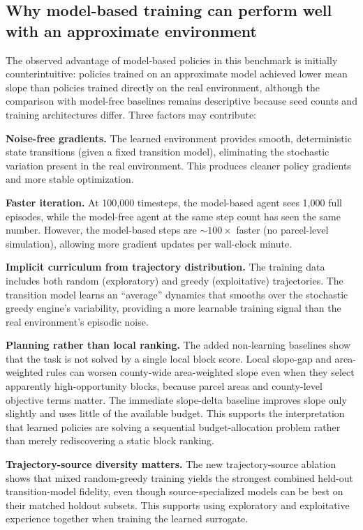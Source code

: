 \documentclass[11pt]{article}
\begin{document}
\subsection{Why model-based training can perform well with an approximate environment}

The observed advantage of model-based policies in this benchmark is initially counterintuitive: policies trained on an approximate model achieved lower mean slope than policies trained directly on the real environment, although the comparison with model-free baselines remains descriptive because seed counts and training architectures differ. Three factors may contribute:

\textbf{Noise-free gradients.} The learned environment provides smooth, deterministic state transitions (given a fixed transition model), eliminating the stochastic variation present in the real environment. This produces cleaner policy gradients and more stable optimization.

\textbf{Faster iteration.} At 100{,}000 timesteps, the model-based agent sees 1{,}000 full episodes, while the model-free agent at the same step count has seen the same number. However, the model-based steps are $\sim$$100\times$ faster (no parcel-level simulation), allowing more gradient updates per wall-clock minute.

\textbf{Implicit curriculum from trajectory distribution.} The training data includes both random (exploratory) and greedy (exploitative) trajectories. The transition model learns an ``average'' dynamics that smooths over the stochastic greedy engine's variability, providing a more learnable training signal than the real environment's episodic noise.

\textbf{Planning rather than local ranking.} The added non-learning baselines show that the task is not solved by a single local block score. Local slope-gap and area-weighted rules can worsen county-wide area-weighted slope even when they select apparently high-opportunity blocks, because parcel areas and county-level objective terms matter. The immediate slope-delta baseline improves slope only slightly and uses little of the available budget. This supports the interpretation that learned policies are solving a sequential budget-allocation problem rather than merely rediscovering a static block ranking.

\textbf{Trajectory-source diversity matters.} The new trajectory-source ablation shows that mixed random-greedy training yields the strongest combined held-out transition-model fidelity, even though source-specialized models can be best on their matched holdout subsets. This supports using exploratory and exploitative experience together when training the learned surrogate.
\end{document}
